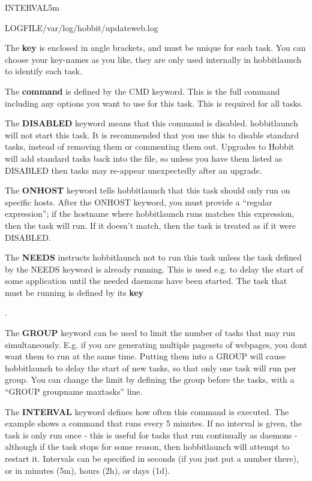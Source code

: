 INTERVAL5m  
 
LOGFILE/var/log/hobbit/updateweb.log 


  The \textbf{key} is enclosed in angle brackets, and must be unique
  for each task. You can choose your key-names as you like, they are
  only used internally in hobbitlaunch to identify each task. 



  The \textbf{command}
 is defined by the CMD keyword. This is the full command including any
 options you want to use for this task. This is required for all
 tasks. 



  The \textbf{DISABLED}
 keyword means that this command is disabled. hobbitlaunch will not
 start this task. It is recommended that you use this to disable
 standard tasks, instead of removing them or commenting them
 out. Upgrades to Hobbit will add standard tasks back into the file,
 so unless you have them listed as DISABLED then tasks may re-appear
 unexpectedly after an upgrade. 



  The \textbf{ONHOST}
 keyword tells hobbitlaunch that this task should only run on specific
 hosts. After the ONHOST keyword, you must provide a ``regular
 expression''; if the hostname where hobbitlaunch runs matches this
 expression, then the task will run. If it doesn't match, then the
 task is treated as if it were DISABLED. 



  The \textbf{NEEDS}
 instructs hobbitlaunch not to run this task unless the task defined
 by the NEEDS keyword is already running. This is used e.g. to delay
 the start of some application until the needed daemons have been
 started. The task that must be running is defined by its \textbf{key}

. 


  The \textbf{GROUP}
 keyword can be used to limit the number of tasks that may run
 simultaneously. E.g. if you are generating multiple pagesets of
 webpages, you dont want them to run at the same time. Putting them
 into a GROUP will cause hobbitlaunch to delay the start of new tasks,
 so that only one task will run per group. You can change the limit by
 defining the group before the tasks, with a ``GROUP groupname
 maxtasks'' line. 



  The \textbf{INTERVAL}
 keyword defines how often this command is executed. The example shows
 a command that runs every 5 minutes. If no interval is given, the
 task is only run once - this is useful for tasks that run continually
 as daemons - although if the task stops for some reason, then
 hobbitlaunch will attempt to restart it. Intervals can be specified
 in seconds (if you just put a number there), or in minutes (5m),
 hours (2h), or days (1d). 



